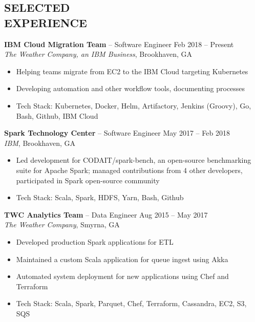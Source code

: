 \documentclass[margin]{res}
\begin{document}
\begin{resume}
\vspace{-2pt}

\section{SELECTED \\ EXPERIENCE}
                \textbf{IBM Cloud Migration Team} -- Software Engineer \hfill Feb 2018 -- Present \\
                \textit{The Weather Company, an IBM Business}, Brookhaven, GA
                \begin{itemize}  \itemsep -2pt %
                  \item Helping teams migrate from EC2 to the IBM Cloud targeting Kubernetes
                  \item Developing automation and other workflow tools, documenting processes
                  \item Tech Stack: Kubernetes, Docker, Helm, Artifactory, Jenkins (Groovy), Go, Bash, Github, IBM Cloud
                \end{itemize}

                \textbf{Spark Technology Center} -- Software Engineer \hfill May 2017 -- Feb 2018 \\
                \textit{IBM}, Brookhaven, GA
                \begin{itemize}  \itemsep -2pt %
                  \item Led development for CODAIT/spark-bench, an open-source benchmarking suite for Apache Spark;
                        managed contributions from 4 other developers, participated in Spark open-source community
                  \item Tech Stack: Scala, Spark, HDFS, Yarn, Bash, Github
                \end{itemize}

                \textbf{TWC Analytics Team} -- Data Engineer \hfill Aug 2015 -- May 2017 \\
                \textit{The Weather Company}, Smyrna, GA
                \begin{itemize}  \itemsep -2pt %
                  \item Developed production Spark applications for ETL
                  \item Maintained a custom Scala application for queue ingest using Akka
                  \item Automated system deployment for new applications using Chef and Terraform
                  \item Tech Stack: Scala, Spark, Parquet, Chef, Terraform, Cassandra, EC2, S3, SQS
                \end{itemize}


\end{resume}
\end{document}
